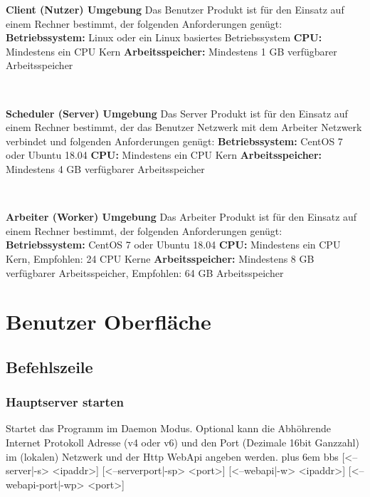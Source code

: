 \documentclass[a4paper,12pt]{article}
\makeatletter
\newenvironment{mycode}
 {\def\@xobeysp{\ }\verbatim\rightskip=0pt plus 6em\relax}
 {\endverbatim}
\makeatother
\begin{document}
\begin{itemize}
\begin{minipage}[t]{\linewidth}
\item \textbf{Client (Nutzer) Umgebung}\newline
Das Benutzer Produkt ist für den Einsatz auf einem Rechner bestimmt, der folgenden Anforderungen genügt:
\subitem \textbf{Betriebssystem:} Linux oder ein Linux basiertes Betriebssystem
\subitem \textbf{CPU:} Mindestens ein CPU Kern
\subitem \textbf{Arbeitsspeicher:} Mindestens 1 GB verfügbarer Arbeitsspeicher
\end{minipage}
\\

\begin{minipage}[t]{\linewidth}
\item \textbf{Scheduler (Server) Umgebung}\newline
Das Server Produkt ist für den Einsatz auf einem Rechner bestimmt, der das Benutzer Netzwerk mit dem Arbeiter Netzwerk verbindet und folgenden Anforderungen genügt:
\subitem \textbf{Betriebssystem:} CentOS 7 oder Ubuntu 18.04
\subitem \textbf{CPU:} Mindestens ein CPU Kern
\subitem \textbf{Arbeitsspeicher:} Mindestens 4 GB verfügbarer Arbeitsspeicher
\end{minipage}
\\

\begin{minipage}[t]{\linewidth}
\item \textbf{Arbeiter (Worker) Umgebung}\newline
Das Arbeiter Produkt ist für den Einsatz auf einem Rechner bestimmt, der folgenden Anforderungen genügt:
\subitem \textbf{Betriebssystem:} CentOS 7 oder Ubuntu 18.04
\subitem \textbf{CPU:} Mindestens ein CPU Kern, Empfohlen: 24 CPU Kerne
\subitem \textbf{Arbeitsspeicher:} Mindestens 8 GB verfügbarer Arbeitsspeicher, Empfohlen: 64 GB Arbeitsspeicher
\end{minipage}
\end{itemize}

\clearpage
\section{Benutzer Oberfläche}
\subsection{Befehlszeile}

\subsubsection{Hauptserver starten}
Startet das Programm im \gls{Daemon} Modus. Optional kann die Abhöhrende Internet Protokoll Adresse (v4 oder v6) und den Port (Dezimale 16bit Ganzzahl) im (lokalen) Netzwerk und der Http WebApi angeben werden.
\begin{mycode}
bbs [<--server|-s> <ipaddr>] [<--serverport|-sp> <port>] [<--webapi|-w> <ipaddr>] [<--webapi-port|-wp> <port>]
\end{mycode}
\end{document}
